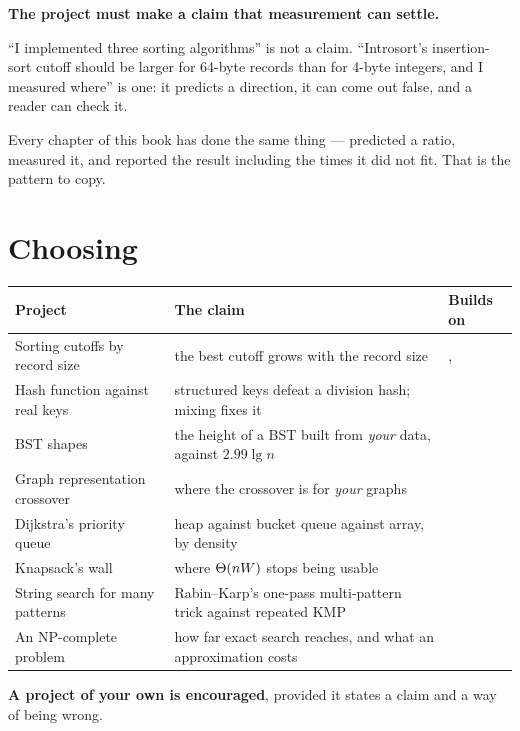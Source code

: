 \begin{conceptbox}
\textbf{The project must make a claim that measurement can settle.}

\smallskip
``I implemented three sorting algorithms'' is not a claim. ``Introsort's
insertion-sort cutoff should be larger for 64-byte records than for 4-byte
integers, and I measured where'' is one: it predicts a direction, it can come
out false, and a reader can check it.

\smallskip
Every chapter of this book has done the same thing --- predicted a ratio,
measured it, and reported the result including the times it did not fit. That
is the pattern to copy.
\end{conceptbox}

\section{Choosing}

\begin{conceptbox}
\begin{longtable}{@{}L{4.6cm}L{4.4cm}L{5.0cm}@{}}
\toprule
{}
\textbf{Project} & \textbf{The claim} & \textbf{Builds on} \\
\midrule
\endhead
Sorting cutoffs by record size & the best cutoff grows with the record size
  & ,  \\
Hash function against real keys & structured keys defeat a division hash;
  mixing fixes it &  \\
BST shapes & the height of a BST built from \emph{your} data, against
  $2.99\lg n$ &  \\
Graph representation crossover & where the crossover is for \emph{your}
  graphs &  \\
Dijkstra's priority queue & heap against bucket queue against array, by
  density &  \\
Knapsack's wall & where $\Theta(nW)$ stops being usable &  \\
String search for many patterns & Rabin--Karp's one-pass multi-pattern trick
  against repeated KMP &  \\
An NP-complete problem & how far exact search reaches, and what an
  approximation costs &  \\
\bottomrule
\end{longtable}

\smallskip
\textbf{A project of your own is encouraged}, provided it states a claim and a
way of being wrong.
\end{conceptbox}

